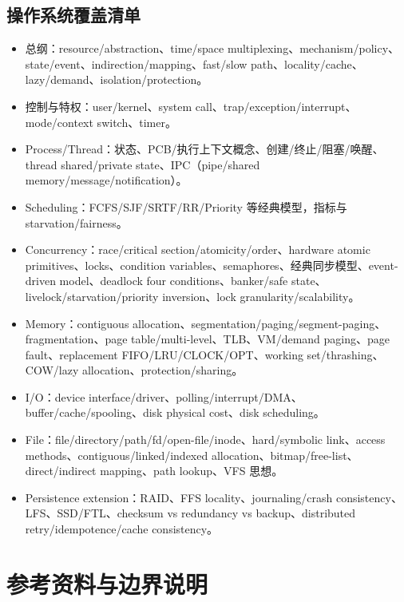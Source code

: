 \documentclass[11pt,a4paper,openany]{ctexbook}
\begin{document}
\section{操作系统覆盖清单}
\begin{itemize}
  \item 总纲：resource/abstraction、time/space multiplexing、mechanism/policy、state/event、indirection/mapping、fast/slow path、locality/cache、lazy/demand、isolation/protection。
  \item 控制与特权：user/kernel、system call、trap/exception/interrupt、mode/context switch、timer。
  \item Process/Thread：状态、PCB/执行上下文概念、创建/终止/阻塞/唤醒、thread shared/private state、IPC（pipe/shared memory/message/notification）。
  \item Scheduling：FCFS/SJF/SRTF/RR/Priority 等经典模型，指标与 starvation/fairness。
  \item Concurrency：race/critical section/atomicity/order、hardware atomic primitives、locks、condition variables、semaphores、经典同步模型、event-driven model、deadlock four conditions、banker/safe state、livelock/starvation/priority inversion、lock granularity/scalability。
  \item Memory：contiguous allocation、segmentation/paging/segment-paging、fragmentation、page table/multi-level、TLB、VM/demand paging、page fault、replacement FIFO/LRU/CLOCK/OPT、working set/thrashing、COW/lazy allocation、protection/sharing。
  \item I/O：device interface/driver、polling/interrupt/DMA、buffer/cache/spooling、disk physical cost、disk scheduling。
  \item File：file/directory/path/fd/open-file/inode、hard/symbolic link、access methods、contiguous/linked/indexed allocation、bitmap/free-list、direct/indirect mapping、path lookup、VFS 思想。
  \item Persistence extension：RAID、FFS locality、journaling/crash consistency、LFS、SSD/FTL、checksum vs redundancy vs backup、distributed retry/idempotence/cache consistency。
\end{itemize}

\chapter{参考资料与边界说明}
\end{document}
